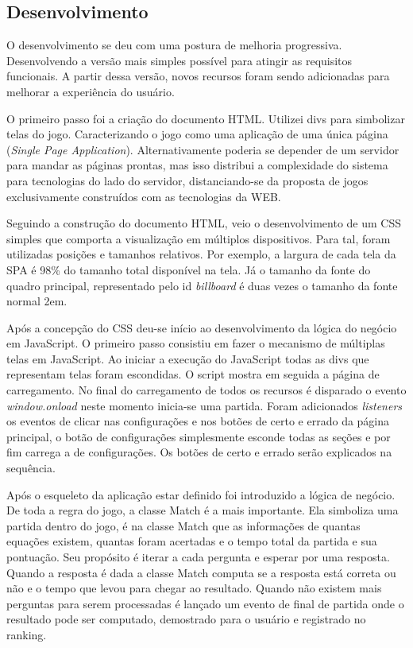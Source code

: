 \begin{draft}
\section{Desenvolvimento}

O desenvolvimento se deu com uma postura de melhoria progressiva.
Desenvolvendo a versão mais simples possível para atingir as
requisitos funcionais. A partir dessa versão, novos recursos foram
sendo adicionadas para melhorar a experiência do usuário.

O primeiro passo foi a criação do documento HTML. Utilizei divs
para simbolizar telas do jogo. Caracterizando o jogo como uma
aplicação de uma única página (\textit{Single Page Application}).
Alternativamente poderia se depender de um servidor para mandar as
páginas prontas, mas isso distribui a complexidade do sistema para
tecnologias do lado do servidor, distanciando-se da proposta de jogos
exclusivamente construídos com as tecnologias da WEB.

Seguindo a construção do documento HTML, veio o desenvolvimento de um
CSS simples que comporta a visualização em múltiplos dispositivos.
Para tal, foram utilizadas posições e tamanhos relativos. Por exemplo,
a largura de cada tela da SPA é 98\% do tamanho total disponível na
tela. Já o tamanho da fonte do quadro principal, representado pelo id
\textit{billboard} é duas vezes o tamanho da fonte normal 2em.

Após a concepção do CSS deu-se início ao desenvolvimento da lógica do 
negócio em JavaScript. O primeiro passo consistiu em fazer o mecanismo 
de múltiplas telas em JavaScript. Ao iniciar a execução do JavaScript
todas as divs que representam telas foram escondidas. O script mostra
em seguida a página de carregamento. No final do carregamento de todos 
os recursos é disparado o evento \textit{window.onload} neste momento
inicia-se uma partida. Foram adicionados  \textit{listeners} os eventos de 
clicar nas configurações e nos botões de certo e errado da página principal, 
o botão de configurações simplesmente esconde todas as seções  e por fim carrega
a de configurações. Os botões de certo e errado serão explicados na sequência.

Após o esqueleto da aplicação estar definido foi introduzido a lógica de negócio.
De toda a regra do jogo, a classe Match é a mais importante.
Ela simboliza uma partida dentro do jogo, é na classe Match que 
as informações de quantas equações existem, quantas foram acertadas
e o tempo total da partida e sua pontuação. Seu propósito é iterar 
a cada pergunta e esperar por uma resposta. Quando a resposta é dada
a classe Match computa se a resposta está correta ou não e o tempo 
que levou para chegar ao resultado. Quando não existem mais perguntas 
para serem processadas é lançado um evento de final de partida onde 
o resultado pode ser computado, demostrado para o usuário e registrado 
no ranking.


\end{draft}
